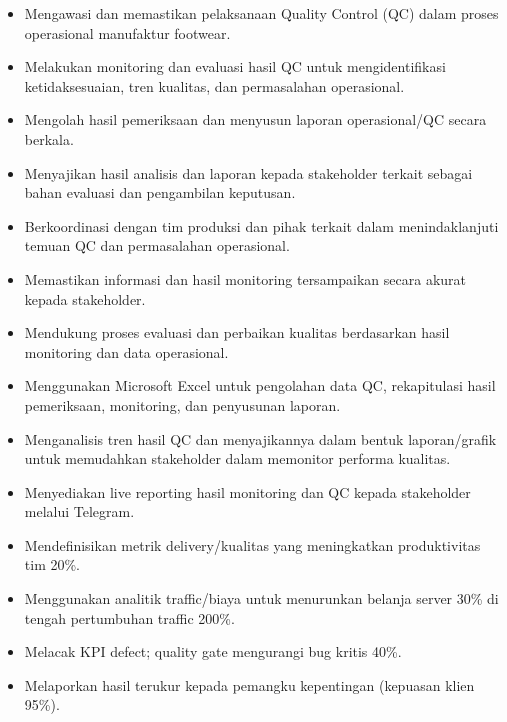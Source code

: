 
\begin{itemize}
\item Mengawasi dan memastikan pelaksanaan Quality Control (QC) dalam proses operasional manufaktur footwear.
\item Melakukan monitoring dan evaluasi hasil QC untuk mengidentifikasi ketidaksesuaian, tren kualitas, dan permasalahan operasional.
\item Mengolah hasil pemeriksaan dan menyusun laporan operasional/QC secara berkala.
\item Menyajikan hasil analisis dan laporan kepada stakeholder terkait sebagai bahan evaluasi dan pengambilan keputusan.
\item Berkoordinasi dengan tim produksi dan pihak terkait dalam menindaklanjuti temuan QC dan permasalahan operasional.
\item Memastikan informasi dan hasil monitoring tersampaikan secara akurat kepada stakeholder.
\item Mendukung proses evaluasi dan perbaikan kualitas berdasarkan hasil monitoring dan data operasional.
\item Menggunakan Microsoft Excel untuk pengolahan data QC, rekapitulasi hasil pemeriksaan, monitoring, dan penyusunan laporan.
\item Menganalisis tren hasil QC dan menyajikannya dalam bentuk laporan/grafik untuk memudahkan stakeholder dalam memonitor performa kualitas.
\item Menyediakan live reporting hasil monitoring dan QC kepada stakeholder melalui Telegram.
\end{itemize}
\divider

\begin{itemize}
\item Mendefinisikan metrik delivery/kualitas yang meningkatkan produktivitas tim 20\%.
\item Menggunakan analitik traffic/biaya untuk menurunkan belanja server 30\% di tengah pertumbuhan traffic 200\%.
\item Melacak KPI defect; quality gate mengurangi bug kritis 40\%.
\item Melaporkan hasil terukur kepada pemangku kepentingan (kepuasan klien 95\%).
\end{itemize}
\divider

